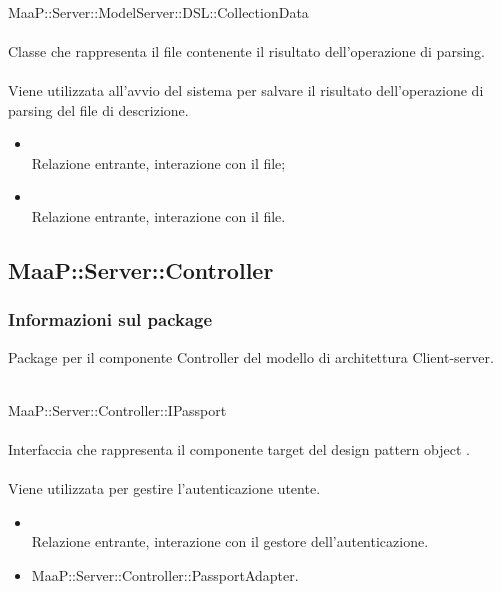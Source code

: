 \\
MaaP::Server::ModelServer::DSL::CollectionData\\
\\
Classe che rappresenta il file contenente il risultato dell'operazione di parsing.\\
\\
Viene utilizzata all'avvio del sistema per salvare il risultato dell'operazione di parsing del file di descrizione.\\
\begin{itemize}
\item{}\\
Relazione entrante, interazione con il file;
\item{}\\
Relazione entrante, interazione con il file.
\end{itemize}


\subsection{MaaP::Server::Controller}
\subsubsection{Informazioni sul package}
Package per il componente Controller del modello di architettura Client-server.

\\
MaaP::Server::Controller::IPassport\\
\\
Interfaccia che rappresenta il componente target del design pattern object .\\
\\
Viene utilizzata per gestire l'autenticazione utente.\\
\begin{itemize}
\item{}\\
Relazione entrante, interazione con il gestore dell'autenticazione.
\end{itemize}
\begin{itemize}
\item MaaP::Server::Controller::PassportAdapter.
\end{itemize}

